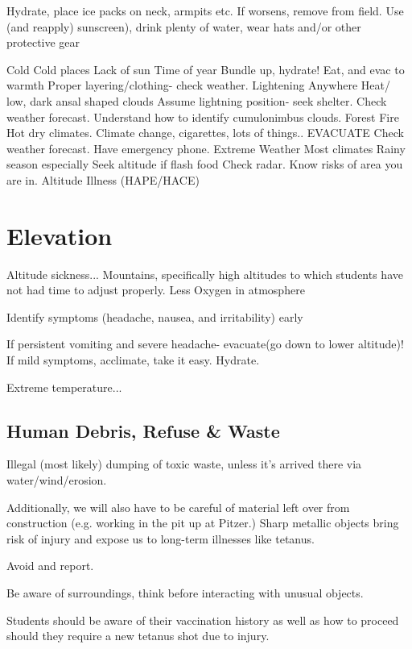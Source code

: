 \documentclass[12pt]{../SOP3_beta}
\begin{document}
\NP Hydrate, place ice packs on neck, armpits etc. If worsens, remove from field.
Use (and reapply) sunscreen), drink plenty of water, wear hats and/or other protective gear

Cold
Cold places
Lack of sun
Time of year
Bundle up, hydrate! Eat, and evac to warmth
Proper layering/clothing- check weather.
Lightening
Anywhere
Heat/ low, dark ansal shaped clouds
Assume lightning position- seek shelter.
Check weather forecast. Understand how to identify cumulonimbus clouds.
Forest Fire
Hot dry climates.
Climate change, cigarettes, lots of things..
EVACUATE
Check weather forecast. Have emergency phone.
Extreme Weather
Most climates
Rainy season especially
Seek altitude if flash food
Check radar. Know risks of area you are in.
Altitude Illness (HAPE/HACE)

\section{Elevation}

\NP Altitude sickness... Mountains, specifically high altitudes to which students have not had time to adjust properly. Less Oxygen in atmosphere

\NP Identify symptoms (headache, nausea, and irritability) early

\NP If persistent vomiting and severe headache- evacuate(go down to lower altitude)! If mild symptoms, acclimate, take it easy. Hydrate.

\NP Extreme temperature...

\NP 

\NP 

\subsection{Human Debris, Refuse \& Waste}

Illegal (most likely) dumping of toxic waste, unless it’s arrived there via water/wind/erosion.


\NP Additionally, we will also have to be careful of material left over from construction (e.g. working in the pit up at Pitzer.) Sharp metallic objects bring risk of injury and expose us to long-term illnesses like tetanus.

\NP Avoid and report.

\NP Be aware of surroundings, think before interacting with unusual objects.

\NP Students should be aware of their vaccination history as well as how to proceed should they require a new tetanus shot due to injury.
\end{document}
